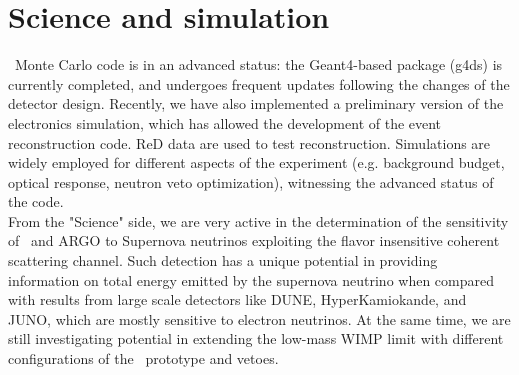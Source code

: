 \section{Science and simulation}
\label{sec:Offline}


\DSk\ Monte Carlo code is in an advanced status: the Geant4-based package (g4ds) is currently completed, and undergoes  frequent updates following the changes of the detector design. Recently, we have also implemented  a preliminary version of the electronics simulation, which has allowed the development of the event reconstruction code. ReD data are used to test reconstruction. Simulations are widely employed for different aspects of the experiment (e.g. background budget, optical response, neutron veto optimization), witnessing the advanced status of the code. \\
From the "Science" side, we are very active in the determination of the sensitivity of \DSk\ and ARGO to Supernova neutrinos exploiting the flavor insensitive coherent scattering channel.  
Such detection has a unique potential in providing information on total energy emitted by the supernova neutrino when compared with results from large scale detectors like DUNE, HyperKamiokande, and JUNO, which are mostly sensitive to electron neutrinos.
At the same time, we are still investigating potential in extending the low-mass WIMP limit with different configurations of the \DSk\ prototype and vetoes.